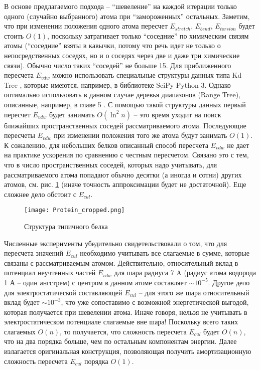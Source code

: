   В основе предлагаемого подхода -- ``шевеление'' на каждой итерации только 
  одного (случайно выбранного) атома при ``замороженных'' остальных. Заметим, 
  что при изменении положения одного атома пересчет $E_{stretch} $, $E_{bend} 
  $, $E_{torsion} $ будет стоить ${O}\left( 1 \right)$, поскольку 
  затрагивает только ``соседние'' по химическим связям атомы (``соседние'' 
  взяты в кавычки, потому что речь идет не только о непосредственных соседях, 
  но и о соседях через две и даже три химические связи). Обычно число таких 
  ``соседей'' не больше 15. Для приближенного пересчета $E_{vdw} $ можно использовать 
  специальные структуры данных типа Kd Tree \cite{de2000computational}, которые имеются, например, в 
  библиотеке SciPy Python 3. Однако оптимально использовать в данном случае 
  деревья диапазонов (Range Tree), описанные, например, в главе 5 \cite{de2000computational}. С помощью такой структуры данных первый пересчет $E_{vdw} $ будет занимать 
  ${O}\left( {\ln ^2n} \right)$ -- это время уходит на поиск ближайших 
  пространственных соседей рассматриваемого атома. Последующие пересчеты 
  $E_{vdw} $ при изменении положения того же атома будут занимать ${
  O}\left( 1 \right)$. К сожалению, для небольших белков описанный способ пересчета $E_{vdw}$ не дает на практике ускорения по сравнению с честным пересчетом. Связано это с тем, что в число пространственных соседей, которых надо учитывать, для рассматриваемого атома попадают обычно десятки (а иногда и сотни) других атомов, см. рис. \ref{belok} (иначе точность аппроксимации будет не достаточной). Еще сложнее дело обстоит с $E_{cul} $. 

  \begin{figure}
  \begin{center}
  \texttt{[image: Protein\_cropped.png]}
  \end{center}
  \caption{Структура типичного белка}
  \label{belok}
  \end{figure}
   
  Численные эксперименты убедительно свидетельствовали о том, что для пересчета значений $E_{cul} $ необходимо учитывать все слагаемые в сумме, которые связаны с рассматриваемым атомом. Действительно, относительный вклад в потенциал неучтенных частей $E_{vdw}$ для шара радиуса 7 A (радиус атома водорода 1 А -- один ангстрем) с центром в данном атоме составляет $\sim 10^{-5}$. Другое дело для электростатической составляющей $E_{cul}$ -- для этого же шара относительный вклад будет $\sim 10^{-3}$, что уже сопоставимо с возможной энергетической выгодой, которая получается при шевелении атома. Иначе говоря, нельзя не учитывать в электростатическом потенциале слагаемые вне шара! Поскольку всего таких слагаемых 
  ${O}\left( n \right)$, то получается, что сложность пересчета $E_{cul} $ будет ${
  O}\left( n \right)$, что на два порядка больше, чем по остальным 
  компонентам энергии. Далее излагается  оригинальная конструкция, позволяющая получить амортизационную сложность пересчета 
  $E_{cul} $ порядка ${O}\left( 1 \right)$. 

